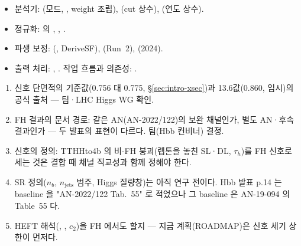 \begin{impl}
\begin{itemize}
  \item 분석기: (모드, , weight 조립), (cut 상수), (연도 상수).
  \item 정규화:  의 , , .
  \item 파생 보정: (, DeriveSF), (Run~2), (2024).
  \item 출력 처리: , . 작업 흐름과 의존성: .
\end{itemize}
\end{impl}

\begin{openq}[1 장의 미결 사항]
\begin{enumerate}
  \item 신호 단면적의 기준값(0.756 대 0.775\fb, \S\ref{sec:intro-xsec})과 13.6\TeV 값(0.860\fb, 임시)의 공식 출처 — 팀·LHC Higgs WG 확인.
  \item FH 결과의 문서 경로: 같은 AN(AN-2022/122)의 보완 채널인가, 별도 AN·후속 결과인가 — 두 발표의 표현이 다르다. 팀(Hbb 컨비너) 결정.
  \item 신호의 정의: TTHHto4b 의 비-FH 붕괴(렙톤을 놓친 SL·DL, $\tau_h$)를 FH 신호로 세는 것은 결합 때 채널 직교성과 함께 정해야 한다.
  \item SR 정의($n_b$, $n_{\mathrm{jets}}$ 범주, Higgs 질량창)는 아직 연구 전이다. Hbb 발표 p.14 는 baseline 을 "AN-2022/122 Tab.~55" 로 적었으나
        그 baseline 은 AN-19-094 의 Table~55 다.
  \item HEFT 해석(\kl, \kt, $c_2$)을 FH 에서도 할지 — 지금 계획(ROADMAP)은 신호 세기 상한이 먼저다.
\end{enumerate}
\end{openq}

